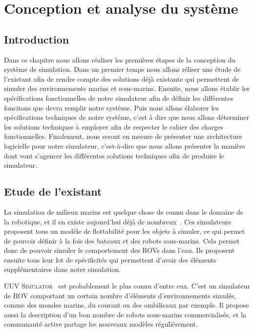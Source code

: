 \chapter{Conception et analyse du système}
\label{chapitre:systeme}

    \section{Introduction}

        Dans ce chapitre nous allons réaliser les premières étapes de la conception du système de simulation. Dans un premier temps nous allons réliser une étude de l'existant afin de rendre compte des solutions déjà existante qui permettent de simuler des environnements marins et sous-marins. Ensuite, nous allons établir les spécifications fonctionnelles de notre simulateur afin de définir les différentes foncitons que devra remplir notre système. Puis nous allons élaborer les spécifications techniques de notre système, c'est à dire que nous allons déterminer les solutions techniques à employer afin de respecter le cahier des charges fonctionnelles. Finalement, nous seront en mesure de présenter une architecture logicielle pour notre simulateur, c'est-à-dire que nous allons présenter la manière dont vont s'agencer les différentes solutions techniques afin de produire le simulateur.

    \section{Etude de l'existant}

        La simulation de milieux marins est quelque chose de connu dans le domaine de la robotique, et il en existe aujourd'hui déjà de nombreux~\cite{Manhaes_2016, bingham19toward, MARS, Rock}. Ces simulateurs proposent tous un modèle de flottabilité pour les objets à simuler, ce qui permet de pouvoir définir à la fois des bateaux et des robots sous-marins. Cela permet donc de pouvoir simuler le comportement des \gls{ROV}s dans l'eau. Ils proposent ensuite tous leur lot de spécificités qui permettent d'avoir des éléments supplémentaires dans notre simulation.
        
        \textsc{UUV Simulator}~\cite{Manhaes_2016} est probablement le plus connu d'entre eux. C'est un simulateur de \gls{ROV} comportant un certain nombre d'éléments d'environnements simulés, comme des mondes marins, du courant ou des ombilicaux par exemple. Il propose aussi la description d'un bon nombre de robots sous-marins commercialisés, et la communauté active partage les nouveaux modèles régulièrement.
        
